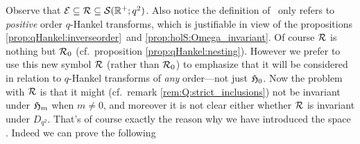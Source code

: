 Observe that $\mathcal E  \subseteq \mathcal R \subseteq {\mathcal S}(\mathbb{R}^+;q^2)$.
Also notice the definition of \Hcore\ only refers to {\em positive\/}
order $q$-Hankel transforms, which is justifiable in view of
the propositions \ref{prop:qHankel:inverseorder}\ and \ref{prop:holS:Omega_invariant}\@.
Of course $\mathcal R$ is nothing but ${\mathcal R}_{0}$ (cf.\ proposition \ref{prop:qHankel:nesting}).
However we prefer to use this new symbol $\mathcal R$ (rather than ${\mathcal R}_{0}$)
to emphasize that it will be considered in relation to $q$-Hankel transforms
of {\em any\/} order---not just $\mathfrak{H}_{0}$.
Now the problem with $\mathcal R$ is that it might
(cf.\ remark \ref{rem:Q:strict_inclusions})
not be invariant under $\mathfrak{H}_{m}$ when $m \neq 0$, and moreover it
is not clear either whether $\mathcal R$ is invariant under $D_{q^2}$.
That's of course exactly the reason why we have introduced the space \Hcore\@.
Indeed we can prove the following

